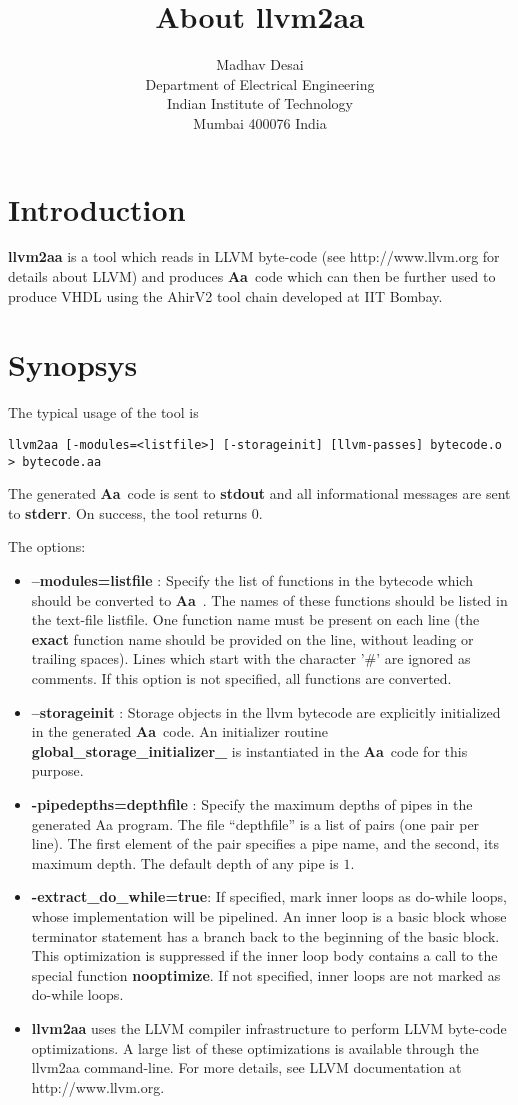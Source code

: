 \documentclass{article}
\title{About {\bf llvm2aa}}
\author{Madhav Desai \\ Department of Electrical Engineering \\ Indian Institute of Technology \\
	Mumbai 400076 India}
\newcommand{\Aa}{{\bf Aa}~}
\begin{document}
\maketitle

\section{Introduction}

{\bf llvm2aa}  is a tool which reads in LLVM byte-code (see http://www.llvm.org for
details about LLVM) and produces \Aa code which can then be further used
to produce VHDL using the AhirV2 tool chain developed at IIT Bombay.

\section{Synopsys}

The typical usage of the tool is 
\begin{verbatim}
llvm2aa [-modules=<listfile>] [-storageinit] [llvm-passes] bytecode.o > bytecode.aa
\end{verbatim}
The generated \Aa code is sent to {\bf stdout} and all informational
messages are sent to {\bf stderr}.  On success, the tool returns 0.

The options:
\begin{itemize}
\item {\bf --modules=listfile} : Specify the list of functions in the bytecode
which should be converted to \Aa.   The names of these functions should be
listed in the text-file listfile.  One function name must be present
on each line (the {\bf exact} function name should be provided on the line, without leading
or trailing spaces).  Lines which start with the character '\#' are
ignored as comments.  If this option is not specified, all functions
are converted.  
\item {\bf --storageinit} :  Storage objects in the llvm bytecode
are explicitly initialized in the generated \Aa code.   An initializer
routine {\bf global\_storage\_initializer\_} is instantiated in
the \Aa code for this purpose.
\item {\bf -pipedepths=depthfile} : Specify the maximum depths of
pipes in the generated Aa program. The file ``depthfile'' is a list
of pairs (one pair per line).  The first element of the pair specifies
a pipe name, and the second, its maximum depth.   The default depth
of any pipe is $1$.
\item {\bf -extract\_do\_while=true}: If specified, mark inner loops
as do-while loops, whose implementation will be
pipelined.  An inner loop is a basic block whose terminator
statement has a branch back to the beginning of the basic block. 
This optimization is suppressed if the inner loop body contains a
call to the special function {\bf nooptimize}.  If not specified,
inner loops are not marked as do-while loops.
\item {\bf llvm2aa} uses the LLVM compiler
infrastructure to perform LLVM byte-code optimizations.  A large list
of these optimizations is available through the llvm2aa command-line.
For more details, see LLVM documentation at http://www.llvm.org.
\end{itemize}
\end{document}
